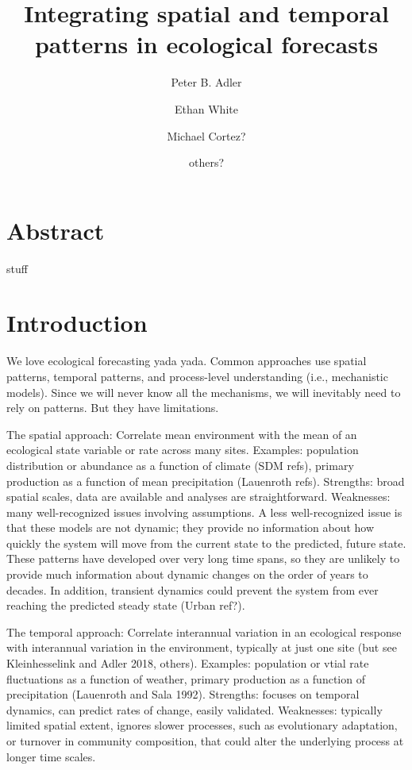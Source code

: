 \documentclass[11pt]{article}
\title{\textbf{Integrating spatial and temporal patterns in ecological forecasts }}
\author[1]{Peter B. Adler}  %
\author[2]{Ethan White}
\author[3]{Michael Cortez?}
\author[4]{others?}
\affil[1]{Department of Wildland Resources and the Ecology Center, Utah State University, Logan, Utah}
\affil[2]{some shitty Florida joint}
\begin{document}
\maketitle

\linenumbers

\section*{Abstract}

stuff


\section*{Introduction}

We love ecological forecasting yada yada. Common approaches use spatial patterns, temporal patterns, and process-level understanding (i.e., mechanistic models). Since we will never know all the mechanisms, we will inevitably need to rely on patterns. But they have limitations.

The spatial approach: Correlate mean environment with the mean of an ecological state variable or rate across many sites. Examples: population distribution or abundance as a function of climate (SDM refs), primary production as a function of mean precipitation (Lauenroth refs).  Strengths: broad spatial scales, data are available and analyses are straightforward. Weaknesses: many well-recognized issues involving assumptions. A less well-recognized issue is that these models are not dynamic; they provide no information about how quickly the system will move from the current state to the predicted, future state. These patterns have developed over very long time spans, so they are unlikely to provide much information about dynamic changes on the order of years to decades. In addition, transient dynamics could prevent the system from ever reaching the predicted steady state (Urban ref?). 

The temporal approach: Correlate interannual variation in an ecological response with interannual variation in the environment, typically at just one site (but see Kleinhesselink  and Adler 2018, others). Examples: population or vtial rate fluctuations as a function of weather, primary production as a function of precipitation (Lauenroth and Sala 1992). Strengths: focuses on temporal dynamics, can predict rates of change, easily validated. Weaknesses: typically limited spatial extent, ignores slower processes, such as evolutionary adaptation, or turnover in community composition, that could alter the underlying process at longer time scales.
\end{document}
